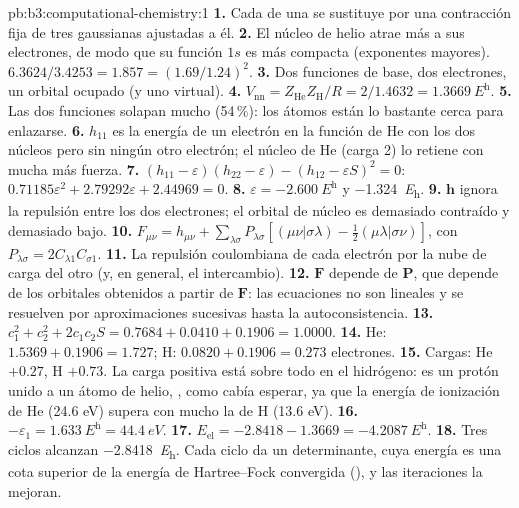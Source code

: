 \begin{solution}{pb:b3:computational-chemistry:1}
\textbf{1.} Cada  de una  se sustituye por una
contracción fija de tres gaussianas ajustadas a él.
\textbf{2.} El núcleo de helio atrae más a sus electrones, de modo que su función $1s$
es más compacta (exponentes mayores). $6.3624/3.4253 = 1.857 = (1.69/1.24)^2$.
\textbf{3.} Dos funciones de base, dos electrones, un orbital ocupado (y uno
virtual).
\textbf{4.} $V_{\mathrm{nn}} = Z_{\mathrm{He}}Z_{\mathrm H}/R = 2/1.4632 =
\qty{1.3669}{\hartree}$.
\textbf{5.} Las dos funciones solapan mucho (54\,\%): los átomos están lo bastante cerca
para enlazarse.
\textbf{6.} $h_{11}$ es la energía de un electrón en la función de He con los dos
núcleos pero sin ningún otro electrón; el núcleo de He (carga 2) lo retiene con mucha más
fuerza.
\textbf{7.} $(h_{11} - \varepsilon)(h_{22} - \varepsilon) - (h_{12} - \varepsilon S)^2 = 0$:
$0.71185\varepsilon^2 + 2.79292\varepsilon + 2.44969 = 0$.
\textbf{8.} $\varepsilon = \qty{-2.600}{\hartree}$ y \qty{-1.324}{\hartree}.
\textbf{9.} $\mathbf h$ ignora la repulsión entre los dos electrones; el orbital de
núcleo es demasiado contraído y demasiado bajo.
\textbf{10.} $F_{\mu\nu} = h_{\mu\nu} + \sum_{\lambda\sigma}P_{\lambda\sigma}[(\mu\nu|\sigma\lambda) -
\frac12(\mu\lambda|\sigma\nu)]$, con $P_{\lambda\sigma} = 2C_{\lambda1}C_{\sigma1}$.
\textbf{11.} La repulsión coulombiana de cada electrón por la nube de carga del
otro (y, en general, el intercambio).
\textbf{12.} $\mathbf F$ depende de $\mathbf P$, que depende de los orbitales obtenidos
a partir de $\mathbf F$: las ecuaciones no son lineales y se resuelven por aproximaciones
sucesivas hasta la autoconsistencia.
\textbf{13.} $c_1^2 + c_2^2 + 2c_1c_2S = 0.7684 + 0.0410 + 0.1906 = 1.0000$.
\textbf{14.} He: $1.5369 + 0.1906 = 1.727$; H: $0.0820 + 0.1906 = 0.273$
electrones.
\textbf{15.} Cargas: He $+0.27$, H $+0.73$. La carga positiva está sobre todo en el
hidrógeno:  es un protón unido a un átomo de helio, , como cabía esperar,
ya que la energía de ionización de He (24.6 eV) supera con mucho la de H (13.6 eV).
\textbf{16.} $-\varepsilon_1 = \qty{1.633}{\hartree} = \qty{44.4}{eV}$.
\textbf{17.} $E_{\mathrm{el}} = -2.8418 - 1.3669 = \qty{-4.2087}{\hartree}$.
\textbf{18.} Tres ciclos alcanzan \qty{-2.8418}{\hartree}. Cada ciclo da un
determinante, cuya energía es una cota superior de la energía de Hartree--Fock
convergida (), y las iteraciones la mejoran.

\end{solution}
